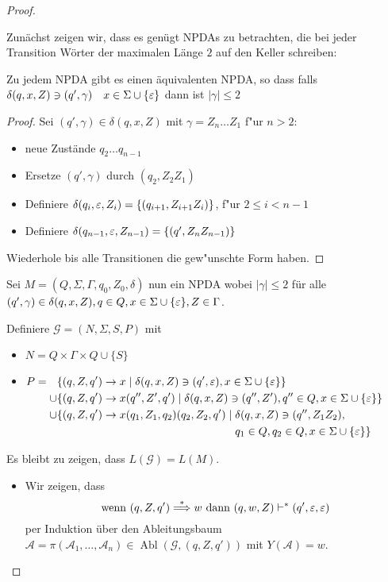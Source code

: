 \begin{proof}
\begin{itemize}
    Zunächst zeigen wir, dass es genügt NPDAs zu betrachten, die bei jeder Transition Wörter der maximalen Länge $2$ auf den Keller schreiben:
\begin{lemma}
	Zu jedem \ac{NPDA} gibt es einen äquivalenten \ac{NPDA}, so dass
	falls $\delta(q,x,Z)\ni (q',\gamma) \quad x\in\Sigma\cup\{\varepsilon\}$
	dann ist $|\gamma| \le 2$
\end{lemma}
\begin{proof}
	Sei $(q',\gamma)\in\delta(q,x,Z)$ mit $\gamma = Z_n\dots Z_1$ f"ur $n>2$:
	\begin{itemize}
	\item 	neue Zustände $q_2\dots q_{n-1}$
	\item Ersetze $(q',\gamma)$ durch $(q_2, Z_2Z_1)$
	\item Definiere $\delta(q_i, \varepsilon, Z_i) = \{ (q_{i+1}, Z_{i+1}Z_i) \}$, f"ur $2\le i < n-1$
	\item Definiere $\delta(q_{n-1}, \varepsilon, Z_{n-1}) = \{ (q', Z_nZ_{n-1}) \}$
	\end{itemize}
	Wiederhole bis alle Transitionen die gew"unschte Form haben. \qedhere
\end{proof}

Sei $M = (Q, \Sigma, \Gamma, q_0, Z_0, \delta)$ nun ein NPDA wobei $|\gamma| \le 2$ für alle $(q', \gamma) \in \delta(q, x, Z), q \in Q, x \in \Sigma \cup \{\varepsilon\}, Z \in \Gamma$.

    Definiere $\mathcal{G} = (N, \Sigma, S, P)$ mit
    \begin{itemize}
    \item $N = Q \times \Gamma \times Q \cup \{S\}$ 
    \item $P =
      \begin{aligned}[t]
        &\{ (q, Z, q') \to x \mid \delta(q, x, Z) \ni (q', \varepsilon), x \in \Sigma \cup \{\varepsilon\} \} \\
        \cup & \{(q, Z, q') \to x(q'', Z', q') \mid \delta(q, x, Z) \ni (q'', Z'), q'' \in Q, x \in \Sigma \cup \{\varepsilon\}\} \\
        \cup & \{(q, Z, q') \to x(q_1,Z_1,q_2)(q_2, Z_2, q') \mid 
        \begin{aligned}[t]
          & \delta(q, x, Z) \ni (q'', Z_1Z_2), \\
          & q_1 \in Q, q_2 \in Q, x \in \Sigma \cup \{\varepsilon\} \}
        \end{aligned}
      \end{aligned}$
    \end{itemize}

    Es bleibt zu zeigen, dass $L(\mathcal{G}) = L(M)$.
    \begin{itemize}
    \item Wir zeigen, dass 
      \begin{displaymath}
        \text{wenn }(q,Z,q')\stackrel{*}{\Longrightarrow} w \text{ dann } (q,w,Z) \vdash^* (q',\varepsilon,\varepsilon)
      \end{displaymath}
      per Induktion über den Ableitungsbaum $\mathcal{A}=\pi(\mathcal{A}_1, \ldots, \mathcal{A}_n) \in \operatorname{Abl}(\mathcal{G}, (q,Z,q'))$ mit $Y(\mathcal{A}) = w$.


\end{itemize}
\end{itemize}
\end{proof}
